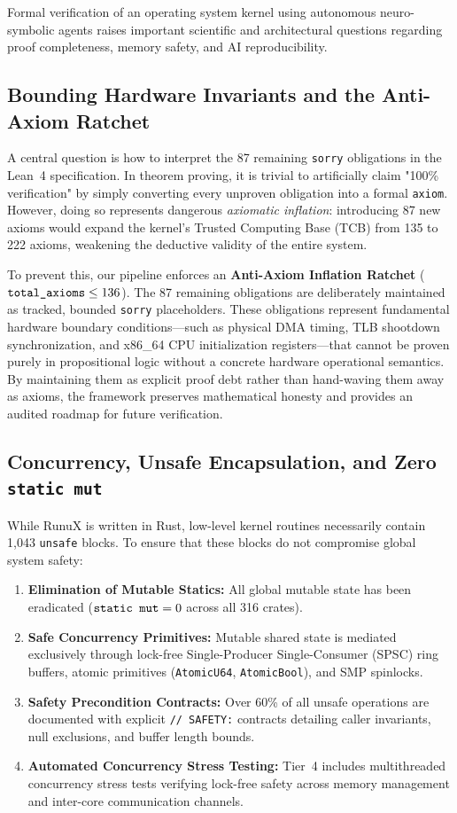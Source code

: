 \documentclass[10pt,twocolumn,letterpaper]{article}
\theoremstyle{definition}
\begin{document}
Formal verification of an operating system kernel using autonomous neuro-symbolic agents raises important scientific and architectural questions regarding proof completeness, memory safety, and AI reproducibility.

\subsection{Bounding Hardware Invariants and the Anti-Axiom Ratchet}
\label{sec:axiom_ratchet}
A central question is how to interpret the 87 remaining \texttt{sorry} obligations in the Lean~4 specification. In theorem proving, it is trivial to artificially claim "100\% verification" by simply converting every unproven obligation into a formal \texttt{axiom}. However, doing so represents dangerous \textit{axiomatic inflation}: introducing 87 new axioms would expand the kernel's Trusted Computing Base (TCB) from 135 to 222 axioms, weakening the deductive validity of the entire system.

To prevent this, our pipeline enforces an \textbf{Anti-Axiom Inflation Ratchet} ($\text{\texttt{total\_axioms}} \le 136$). The 87 remaining obligations are deliberately maintained as tracked, bounded \texttt{sorry} placeholders. These obligations represent fundamental hardware boundary conditions---such as physical DMA timing, TLB shootdown synchronization, and x86\_64 CPU initialization registers---that cannot be proven purely in propositional logic without a concrete hardware operational semantics. By maintaining them as explicit proof debt rather than hand-waving them away as axioms, the framework preserves mathematical honesty and provides an audited roadmap for future verification.

\subsection{Concurrency, Unsafe Encapsulation, and Zero \texttt{static mut}}
\label{sec:unsafe_encapsulation}
While RunuX is written in Rust, low-level kernel routines necessarily contain 1,043 \texttt{unsafe} blocks. To ensure that these blocks do not compromise global system safety:
\begin{enumerate}
    \item \textbf{Elimination of Mutable Statics:} All global mutable state has been eradicated ($\text{\texttt{static mut}} = 0$ across all 316 crates).
    \item \textbf{Safe Concurrency Primitives:} Mutable shared state is mediated exclusively through lock-free Single-Producer Single-Consumer (SPSC) ring buffers, atomic primitives (\texttt{AtomicU64}, \texttt{AtomicBool}), and SMP spinlocks.
    \item \textbf{Safety Precondition Contracts:} Over 60\% of all unsafe operations are documented with explicit \texttt{// SAFETY:} contracts detailing caller invariants, null exclusions, and buffer length bounds.
    \item \textbf{Automated Concurrency Stress Testing:} Tier~4 includes multithreaded concurrency stress tests verifying lock-free safety across memory management and inter-core communication channels.
\end{enumerate}
\end{document}
